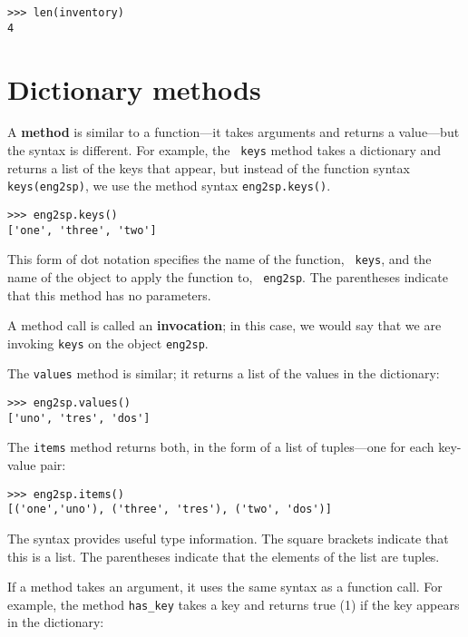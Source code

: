 \beforeverb
\begin{verbatim}
>>> len(inventory)
4
\end{verbatim}
\afterverb
%


\section{Dictionary methods}

A {\bf method} is similar to a function---it takes arguments and
returns a value---but the syntax is different.  For example, the {\tt
keys} method takes a dictionary and returns a list of the keys that
appear, but instead of the function syntax {\tt keys(eng2sp)}, we use
the method syntax {\tt eng2sp.keys()}.


\beforeverb
\begin{verbatim}
>>> eng2sp.keys()
['one', 'three', 'two']
\end{verbatim}
\afterverb
%
This form of dot notation specifies the name of the function, {\tt
keys}, and the name of the object to apply the function to, {\tt
eng2sp}.  The parentheses indicate that this method has no
parameters.

A method call is called an {\bf invocation}; in this case, we would
say that we are invoking {\tt keys} on the object {\tt eng2sp}.

The {\tt values} method is similar; it returns a list of the values in
the dictionary:

\beforeverb
\begin{verbatim}
>>> eng2sp.values()
['uno', 'tres', 'dos']
\end{verbatim}
\afterverb
%
The {\tt items} method returns both, in the form of a
list of tuples---one for each key-value
pair:

\beforeverb
\begin{verbatim}
>>> eng2sp.items()
[('one','uno'), ('three', 'tres'), ('two', 'dos')]
\end{verbatim}
\afterverb
%
The syntax provides useful type information.  The square brackets
indicate that this is a list.  The parentheses indicate that
the elements of the list are tuples.

If a method takes an argument, it uses the same syntax as a function
call.  For example, the method {\tt has\_key} takes a key
and returns
true (1) if the key appears in the dictionary:

